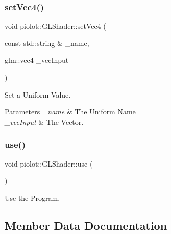 \subsubsection{\texorpdfstring{set\+Vec4()}{setVec4()}\hspace{0.1cm}{\footnotesize\ttfamily [2/2]}}
{\footnotesize\ttfamily void piolot\+::\+G\+L\+Shader\+::set\+Vec4 (\begin{DoxyParamCaption}\item[{const std\+::string \&}]{\+\_\+name,  }\item[{glm\+::vec4}]{\+\_\+vec\+Input }\end{DoxyParamCaption})\hspace{0.3cm}{\ttfamily [inline]}}



Set a Uniform Value. 


\begin{DoxyParams}{Parameters}
{\em \+\_\+name} & The Uniform Name \\
\hline
{\em \+\_\+vec\+Input} & The Vector. \\
\hline
\end{DoxyParams}
\mbox{\label{classpiolot_1_1_g_l_shader_a624427668ba51101fe898e12731069bf}} 
\subsubsection{\texorpdfstring{use()}{use()}}
{\footnotesize\ttfamily void piolot\+::\+G\+L\+Shader\+::use (\begin{DoxyParamCaption}{ }\end{DoxyParamCaption})\hspace{0.3cm}{\ttfamily [inline]}}



Use the Program. 



\subsection{Member Data Documentation}
\mbox{\label{classpiolot_1_1_g_l_shader_aa99f7e5b6b76e8796824278578e4172d}} 
